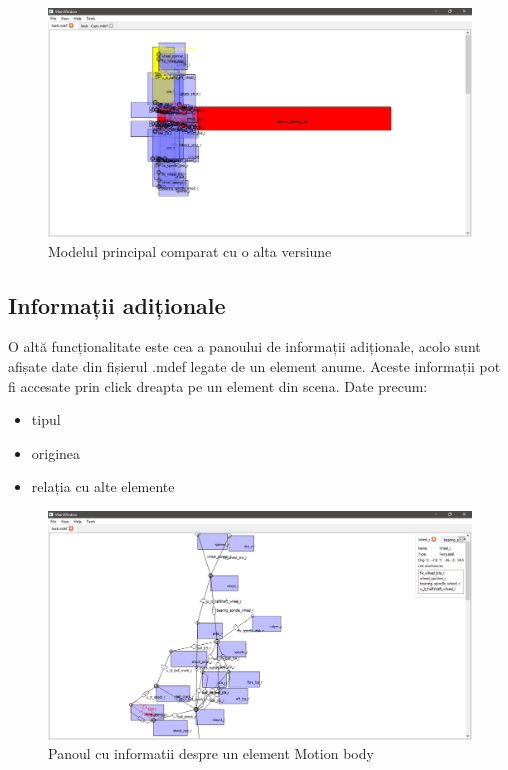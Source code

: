 \begin{figure}[H]
    \includegraphics[width=\linewidth]{imagini/implementare/compare.png}
    \caption{Modelul principal comparat cu o alta versiune}
    \label{fig:tabs}
\end{figure}

\subsection{Informații adiționale}
O altă funcționalitate este cea a panoului de informații adiționale, acolo sunt afișate date din fișierul .mdef legate de un element 
anume. Aceste informații pot fi accesate prin click dreapta pe un element din scena. 
Date precum: 
\begin{itemize}
    \item tipul 
    \item originea
    \item relația cu alte elemente
\end{itemize}

\begin{figure}[H]
    \includegraphics[width=\linewidth]{imagini/implementare/info.png}
    \caption{Panoul cu informatii despre un element Motion body}
    \label{fig:tabs}
\end{figure}

